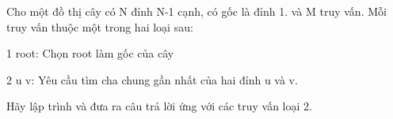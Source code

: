 Cho một đồ thị cây có N đỉnh N-1 cạnh, có gốc là đỉnh 1. và M truy vấn. Mỗi truy vấn thuộc một trong hai loại sau:  

   1 root: Chọn root làm gốc của cây  

   2 u v: Yêu cầu tìm cha chung gần nhất của hai đỉnh u và v.  

   Hãy lập trình và đưa ra câu trả lời ứng với các truy vấn loại 2.